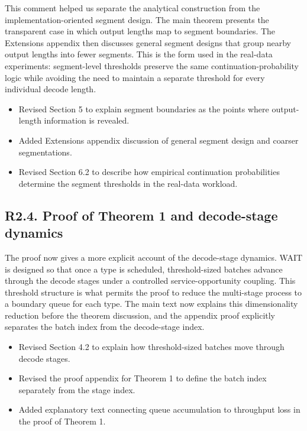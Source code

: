 
\response This comment helped us separate the analytical construction from the implementation-oriented segment design. The main theorem presents the transparent case in which output lengths map to segment boundaries. The Extensions appendix then discusses general segment designs that group nearby output lengths into fewer segments. This is the form used in the real-data experiments: segment-level thresholds preserve the same continuation-probability logic while avoiding the need to maintain a separate threshold for every individual decode length.

\changes
\begin{itemize}
    \item Revised Section 5 to explain segment boundaries as the points where output-length information is revealed.
    \item Added Extensions appendix discussion of general segment design and coarser segmentations.
    \item Revised Section 6.2 to describe how empirical continuation probabilities determine the segment thresholds in the real-data workload.
\end{itemize}

\subsection*{R2.4. Proof of Theorem 1 and decode-stage dynamics}


\response The proof now gives a more explicit account of the decode-stage dynamics. WAIT is designed so that once a type is scheduled, threshold-sized batches advance through the decode stages under a controlled service-opportunity coupling. This threshold structure is what permits the proof to reduce the multi-stage process to a boundary queue for each type. The main text now explains this dimensionality reduction before the theorem discussion, and the appendix proof explicitly separates the batch index from the decode-stage index.

\changes
\begin{itemize}
    \item Revised Section 4.2 to explain how threshold-sized batches move through decode stages.
    \item Revised the proof appendix for Theorem 1 to define the batch index separately from the stage index.
    \item Added explanatory text connecting queue accumulation to throughput loss in the proof of Theorem 1.
\end{itemize}

